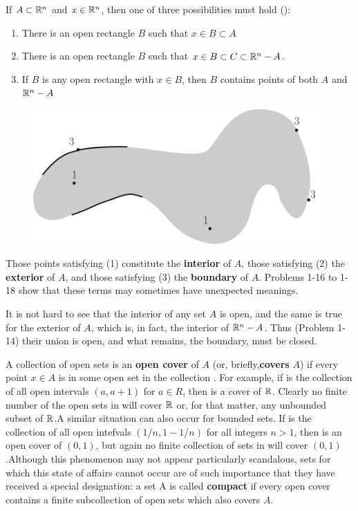 If $A\subset \mathbb{R}^n$ and $x\in \mathbb{R}^n$, then one of three possibilities must
hold ():
\begin{enumerate}[label={\upshape(\arabic*)}]
    \item There is an open rectangle $B$ such that $x\in B\subset A$
    \item There is an open rectangle $B$ such that $x \in B \subset C \subset \mathbb{R}^n-A$.
    \item If $B$ is any open rectangle with $x\in B$, then $B$ contains points of both $A$ and $\mathbb{R}^n-A$
\end{enumerate}

\begin{figure}[!htb]
    \centering
    \includegraphics[width=.75\linewidth]{./pics/Fig1-2.pdf}
    \caption{}
    \label{Fig 1-2}
\end{figure}

Those points satisfying (1) constitute the \textbf{interior} of $A$, those
satisfying (2) the \textbf{exterior} of $A$, and those satisfying (3) the
\textbf{boundary} of $A$. Problems 1-16 to 1-18 show that these terms
may sometimes have unexpected meanings.

It is not hard to see that the interior of any set $A$ is open,
and the same is true for the exterior of $A$, which is, in fact, the
interior of $\mathbb{R}^n-A$. Thus (Problem 1-14) their union is open,
and what remains, the boundary, must be closed.

A collection  of open sets is an \textbf{open cover} of $A$ 
(or, briefly,\textbf{covers} $A$) if every point $x \in A$ is 
in some open set in the collection .
For example, if  is the collection of all open
intervals $(a, a + 1)$ for $a\in R$, then  is a cover of $\mathbb{R}$.
Clearly no finite number of the open sets in  will cover $\mathbb{R}$ or, 
for that matter, any unbounded subset of $\mathbb{R}$.A similar situation can
also occur for bounded sets. 
If  is the collection of all open
intefvals $(1/n, 1-1/n)$ for all integers $n > 1$, then  is an
open cover of $(0,1)$, but again no finite collection of sets in
 will cover $(0,1)$.Although this phenomenon may not appear
particularly scandalous, sets for which this state of affairs
cannot occur are of such importance that they have received a
special designation: a set A is called \textbf{compact} if every open
cover  contains a finite subcollection of open sets which
also covers $A$.


